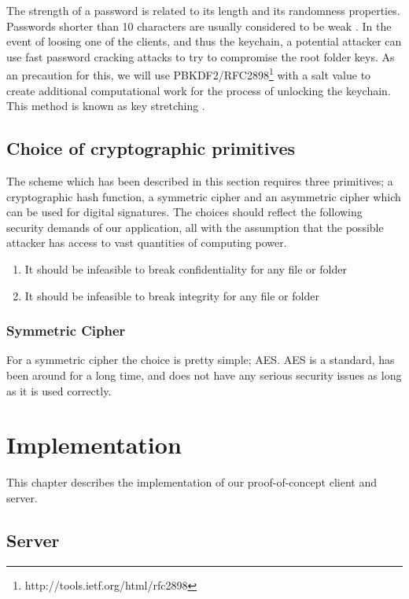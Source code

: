 \documentclass[pdftex,english,10pt,b5paper,twoside]{book}
\begin{document}
The strength of a password is related to its length and its randomness
properties. Passwords shorter than 10 characters are usually considered to be
weak \cite{pbkdf_nist}. In the event of loosing one of the clients, and thus the
keychain, a potential attacker can use fast password cracking attacks to try to
compromise the root folder keys. As an precaution for this, we will use
\ac{PBKDF2}/RFC2898\footnote{http://tools.ietf.org/html/rfc2898} with a salt
value to create additional computational work for the process of unlocking the
keychain. This method is known as key stretching \cite{keystretch}.



\section{Choice of cryptographic primitives}
The scheme which has been described in this section requires three primitives;
a cryptographic hash function, a symmetric cipher and an asymmetric cipher
which can be used for digital signatures. The choices should reflect the
following security demands of our application, all with the assumption that the
possible attacker has access to vast quantities of computing power.

\begin{enumerate}
    \item It should be infeasible to break confidentiality for any file or folder
    \item It should be infeasible to break integrity for any file or folder
\end{enumerate}

\subsection{Symmetric Cipher}
For a symmetric cipher the choice is pretty simple; \ac{AES}. \ac{AES} is
a standard, has been around for a long time, and does not have any serious
security issues as long as it is used correctly.

\chapter{Implementation}
This chapter describes the implementation of our proof-of-concept client and
server.

\section{Server}
\end{document}
